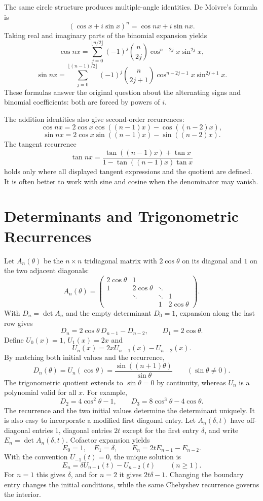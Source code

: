 The same circle structure produces multiple-angle identities. De Moivre's formula is
\[
 (\cos x+i\sin x)^n=\cos nx+i\sin nx.
\]
Taking real and imaginary parts of the binomial expansion yields
\[
 \cos nx=\sum_{j=0}^{\lfloor n/2\rfloor}
 (-1)^j\binom{n}{2j}\cos^{n-2j}x\sin^{2j}x,
\]
\[
 \sin nx=\sum_{j=0}^{\lfloor(n-1)/2\rfloor}
 (-1)^j\binom{n}{2j+1}\cos^{n-2j-1}x\sin^{2j+1}x.
\]
These formulas answer the original question about the alternating signs and binomial coefficients: both are forced by powers of \(i\).

The addition identities also give second-order recurrences:
\[
 \cos nx=2\cos x\cos((n-1)x)-\cos((n-2)x),
\]
\[
 \sin nx=2\cos x\sin((n-1)x)-\sin((n-2)x).
\]
The tangent recurrence
\[
 \tan nx=\frac{\tan((n-1)x)+\tan x}
 {1-\tan((n-1)x)\tan x}
\]
holds only where all displayed tangent expressions and the quotient are defined. It is often better to work with sine and cosine when the denominator may vanish.

\section{Determinants and Trigonometric Recurrences}

Let \(A_n(\theta)\) be the \(n\times n\) tridiagonal matrix with
\(2\cos\theta\) on its diagonal and \(1\) on the two adjacent diagonals:
\[
 A_n(\theta)=
 \begin{pmatrix}
 2\cos\theta&1&&\\
 1&2\cos\theta&\ddots&\\
 &\ddots&\ddots&1\\
 &&1&2\cos\theta
 \end{pmatrix}.
\]
With \(D_n=\det A_n\) and the empty determinant \(D_0=1\), expansion along the last row gives
\[
 D_n=2\cos\theta\,D_{n-1}-D_{n-2},
 \qquad D_1=2\cos\theta.
\]
Define \(U_0(x)=1\), \(U_1(x)=2x\) and
\[
 U_n(x)=2xU_{n-1}(x)-U_{n-2}(x).
\]
By matching both initial values and the recurrence,
\[
 \boxed{D_n(\theta)=U_n(\cos\theta)
     =\frac{\sin((n+1)\theta)}{\sin\theta}}
 \qquad(\sin\theta\ne0).
\]
The trigonometric quotient extends to \(\sin\theta=0\) by continuity, whereas \(U_n\) is a polynomial valid for all \(x\). For example,
\[
 D_2=4\cos^2\theta-1,\qquad
 D_3=8\cos^3\theta-4\cos\theta.
\]
The recurrence and the two initial values determine the determinant uniquely. It is also easy to incorporate a modified first diagonal entry. Let \(A_n(\delta,t)\) have off-diagonal entries \(1\), diagonal entries \(2t\) except for the first entry \(\delta\), and write \(E_n=\det A_n(\delta,t)\). Cofactor expansion yields
\[
 E_0=1,\quad E_1=\delta,\qquad
 E_n=2tE_{n-1}-E_{n-2}.
\]
With the convention \(U_{-1}(t)=0\), the unique solution is
\[
 \boxed{E_n=\delta U_{n-1}(t)-U_{n-2}(t)}
 \qquad(n\ge1).
\]
For \(n=1\) this gives \(\delta\), and for \(n=2\) it gives \(2t\delta-1\). Changing the boundary entry changes the initial conditions, while the same Chebyshev recurrence governs the interior.

